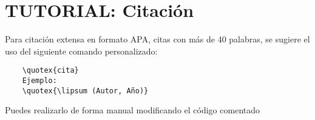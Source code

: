 \section{TUTORIAL: Citación}

Para citación extensa en formato APA, citas con más de 40 palabras, se sugiere el uso del siguiente comando personalizado:

\begin{verbatim}
    \quotex{cita}
    Ejemplo:
    \quotex{\lipsum (Autor, Año)}
\end{verbatim}


Puedes realizarlo de forma manual modificando el código comentado


